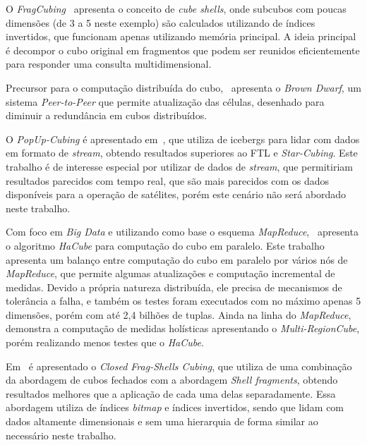 O \textit{FragCubing}~\cite{liHighdimensionalOLAPMinimal2004} apresenta o conceito de \textit{cube shells}, onde subcubos com poucas dimensões (de 3 a 5 neste exemplo) são calculados utilizando de índices invertidos, que funcionam apenas utilizando memória principal.
A ideia principal é decompor o cubo original em fragmentos que podem ser reunidos eficientemente para responder uma consulta multidimensional.

Precursor para o computação distribuída do cubo,~\cite{dokaBrownDwarfFullydistributed2011} apresenta o \textit{Brown Dwarf}, um sistema \textit{Peer-to-Peer} que permite atualização das células, desenhado para diminuir a redundância em cubos distribuídos.

O \textit{PopUp-Cubing} é apresentado em~\cite{heinePopUpCubingAlgorithmEfficiently2017}, que utiliza de icebergs para lidar com dados em formato de \textit{stream}, obtendo resultados superiores ao FTL e \textit{Star-Cubing}.
Este trabalho é de interesse especial por utilizar de dados de \textit{stream}, que permitiriam resultados parecidos com tempo real, que são mais parecidos com os dados disponíveis para a operação de satélites, porém este cenário não será abordado neste trabalho.

Com foco em \textit{Big Data} e utilizando como base o esquema \textit{MapReduce},~\cite{wangScalableDataCube2013} apresenta o algoritmo \textit{HaCube} para computação do cubo em paralelo.
Este trabalho apresenta um balanço entre computação do cubo em paralelo por vários nós de \textit{MapReduce}, que permite algumas atualizações e computação incremental de medidas.
Devido a própria natureza distribuída, ele precisa de mecanismos de tolerância a falha, e também os testes foram executados com no máximo apenas 5 dimensões, porém com até 2,4 bilhões de tuplas.
Ainda na linha do \textit{MapReduce},~\cite{yangHolisticAlgebraicData2017} demonstra a computação de medidas holísticas apresentando o \textit{Multi-RegionCube}, porém realizando menos testes que o \textit{HaCube}.

Em~\cite{zhaoClosedFragShellsCubing2018} é apresentado o \textit{Closed Frag-Shells Cubing}, que utiliza de uma combinação da abordagem de cubos fechados com a abordagem \textit{Shell fragments}, obtendo resultados melhores que a aplicação de cada uma delas separadamente.
Essa abordagem utiliza de índices \textit{bitmap} e índices invertidos, sendo que lidam com dados altamente dimensionais e sem uma hierarquia de forma similar ao necessário neste trabalho.

